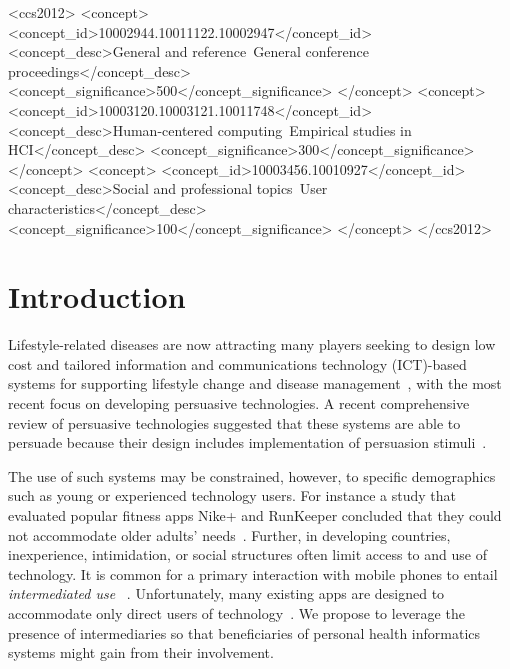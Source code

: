 \documentclass{sig-alternate}
\begin{document}
\begin{CCSXML}
<ccs2012>
<concept>
<concept_id>10002944.10011122.10002947</concept_id>
<concept_desc>General and reference~General conference proceedings</concept_desc>
<concept_significance>500</concept_significance>
</concept>
<concept>
<concept_id>10003120.10003121.10011748</concept_id>
<concept_desc>Human-centered computing~Empirical studies in HCI</concept_desc>
<concept_significance>300</concept_significance>
</concept>
<concept>
<concept_id>10003456.10010927</concept_id>
<concept_desc>Social and professional topics~User characteristics</concept_desc>
<concept_significance>100</concept_significance>
</concept>
</ccs2012>
\end{CCSXML}


%
%

%
%
\printccsdesc



\section{Introduction} 
Lifestyle-related diseases are now attracting many players seeking to design low cost and tailored information and communications technology (ICT)-based systems for supporting lifestyle change and disease management~\cite{arsand:mobile}, with the most recent focus on developing persuasive technologies. A recent comprehensive review of persuasive technologies suggested that these systems are able to persuade because their design includes implementation of persuasion stimuli~\cite{hamari2014persuasive}.

The use of such systems may be constrained, however, to specific demographics such as young or experienced technology users. For instance a study that evaluated popular fitness apps Nike+ and RunKeeper concluded that they could not accommodate older adults' needs~\cite{silva2014:smartphones}. Further, in developing countries, inexperience, intimidation, or social structures often limit access to and use of technology. It is common for a primary interaction with mobile phones to entail \emph{intermediated use} ~\cite{sambasivan2010,kumar2015mobile,katule2016:leveraging}. Unfortunately, many existing apps are designed to accommodate only direct users of technology~\cite{sambasivan2010}. We propose to leverage the presence of intermediaries so that beneficiaries of personal health informatics systems might gain from their involvement.
\end{document}
